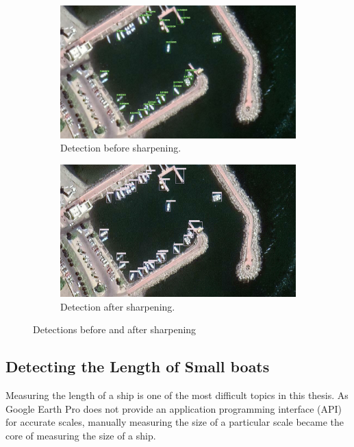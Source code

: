 \begin{figure}[h!]
\centering
\begin{subfigure}[p]{0.7\textwidth}
    \centering
    \includegraphics[width=1\linewidth]{img/before_sharpening.jpg}
    \caption{Detection before sharpening.}
    \label{fig:before_sharpening}
\end{subfigure}

\begin{subfigure}[p]{0.7\textwidth}
    \centering
    \includegraphics[width=1\linewidth]{img/after_sharpening.jpg}
    \caption{Detection after sharpening.}
    \label{fig:after_sharpening}
\end{subfigure}
\caption{Detections before and after sharpening}
\label{fig:sharpening}
\end{figure}


\newpage
\subsection{Detecting the Length of Small boats}
Measuring the length of a ship is one of the most difficult topics in this thesis. As Google Earth Pro does not provide an application programming interface (API) for accurate scales, manually measuring the size of a particular scale became the core of measuring the size of a ship.\\

